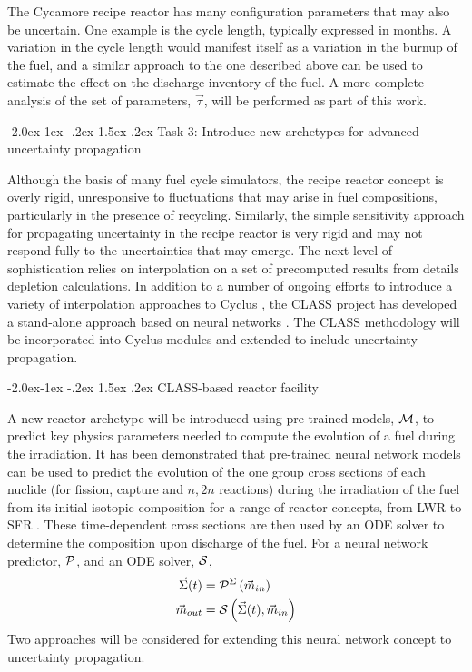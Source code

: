 \documentclass[dvips,12pt]{article}
\makeatletter
\renewcommand\subsection{\@startsection{subsection}{2}{\z@}%
                                     {-2.0ex\@plus -1ex \@minus -.2ex}%
                                     {1.5ex \@plus .2ex}%
                                     {\normalfont\bfseries}}%
\renewcommand\subsubsection{\@startsection{subsubsection}{3}{\z@}%
                                     {-2.0ex\@plus -1ex \@minus -.2ex}%
                                     {1.5ex \@plus .2ex}%
                                     {\normalfont\bfseries}}%
\makeatother
\begin{document}
The Cycamore recipe reactor has many configuration
parameters that may also be uncertain.  One
example is the cycle length, typically expressed
in months.  A variation in the cycle length would
manifest itself as a variation in the burnup of
the fuel, and a similar approach to the one
described above can be used to estimate the effect
on the discharge inventory of the fuel.  A more
complete analysis of the set of parameters,
$\vec{\tau}$, will be performed as part of this work.

\subsection{Task 3: Introduce new archetypes for advanced uncertainty propagation}

Although the basis of many fuel cycle simulators,
the recipe reactor concept is overly rigid,
unresponsive to fluctuations that may arise in fuel
compositions, particularly in the presence of
recycling.  Similarly, the simple sensitivity
approach for propagating uncertainty in the recipe
reactor is very rigid and may not respond fully to
the uncertainties that may emerge.  The next level
of sophistication relies on interpolation on a set
of precomputed results from details depletion
calculations.  In addition to a number of ongoing
efforts to introduce a variety of interpolation
approaches to Cyclus \cite{brightlite, cyborg}, the
CLASS project\cite{CLASS} has developed a
stand-alone approach based on neural networks \cite{Leniau.ANE.2015}. The
CLASS methodology will be incorporated into Cyclus
modules and extended to include uncertainty
propagation.

\subsubsection{CLASS-based reactor facility} \label{sec:reactors}

A new reactor archetype will be introduced using
pre-trained models, ${\cal M}$, to predict key
physics parameters needed to compute the evolution
of a fuel during the irradiation. It has been
demonstrated that pre-trained neural network
models can be used to predict the evolution of the
one group cross sections of each nuclide (for
fission, capture and $n,2n$ reactions) during the
irradiation of the fuel from its initial isotopic
composition for a range of reactor concepts, from
LWR to SFR \cite{Leniau.ANE.2015, Leniau.PHYSOR.2016}.
These time-dependent cross sections are then used
by an ODE solver to determine the composition upon
discharge of the fuel.  For a neural network
predictor, ${\cal P}$, and an ODE solver, ${\cal S}$,
\begin{align}
  \vec{\Sigma}(t) &= {\cal P}^{\Sigma}\left( \vec{m}_{in}\right)\\
  \vec{m}_{out} &= {\cal S}\left( \vec{\Sigma}(t), \vec{m}_{in}\right)
\end{align}
Two approaches will be considered for extending
this neural network concept to uncertainty
propagation.
\end{document}
